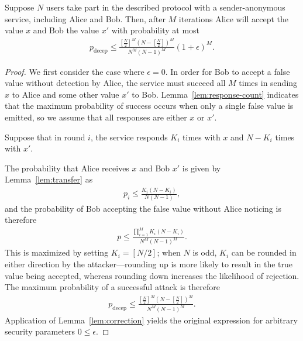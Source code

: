 \documentclass[USenglish]{llncs}
\begin{document}
\begin{theorem}\label{thm:transfer-m}

Suppose $N$
users take part in the described protocol with a sender-anonymous service,
including Alice and Bob.  Then, after $M$ iterations Alice will accept the value
$x$ and Bob the value $x'$ with probability at most
\begin{align}
	p_\mathrm{decep}
		\le \frac{\left[\frac{N}{2}\right]^M \left(N - \left[\frac{N}{2}\right]\right)^M}{N^M (N-1)^M} (1+\epsilon)^M.
\end{align}

\begin{proof}
We first consider the case where $\epsilon = 0$.
In order for Bob to accept a false value without detection by Alice,
the service must succeed all $M$ times in sending $x$ to Alice and some other
value $x'$ to Bob.  Lemma~\ref{lem:response-count}
indicates that the maximum probability of success occurs when only a single
false value is emitted, so we assume that all responses are either
$x$ or $x'$.

Suppose that in round $i$, the service responds $K_i$ times with $x$ and
$N-K_i$ times with $x'$. 

The probability that Alice receives $x$ and Bob $x'$ is given by
Lemma~\ref{lem:transfer} as
\begin{align} p_i \le \frac{K_i (N-K_i)}{N(N-1)} , \end{align}
and the probability of Bob accepting the false value without Alice noticing is therefore
\begin{align} p \le \frac{\prod_{i=1}^{M} K_i (N-K_i)}{N^M (N-1)^M} .\end{align}
This is maximized by setting $K_i = \left[N/2\right]$; when $N$ is odd, $K_i$ can be
rounded in either direction by the attacker---rounding up is more likely to result in the
true value being accepted, whereas rounding down increases the likelihood
of rejection.  The maximum probability of a successful attack is therefore
\begin{align}
	p_\mathrm{decep} \le \frac{\left[\frac{N}{2}\right]^M \left(N - \left[\frac{N}{2}\right]\right)^M}{N^M (N-1)^M} .
\end{align}
Application of Lemma~\ref{lem:correction} yields the original expression for
arbitrary security parameters $0 \le \epsilon$.
\end{proof}

\end{theorem}
\end{document}
